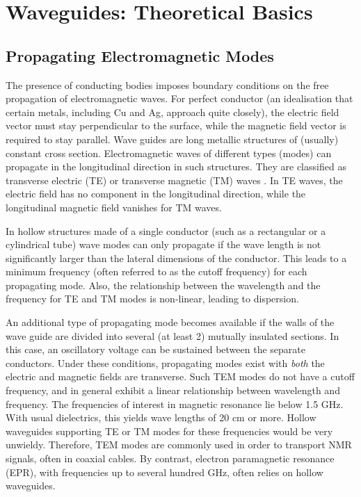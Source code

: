 \section{Waveguides: Theoretical Basics}\label{striplines-and-microslots-basics-and-theory}

\subsection{Propagating Electromagnetic Modes}\label{definition-of-a-stripline}

The presence of conducting bodies imposes boundary conditions on the
free propagation of electromagnetic waves. For perfect conductor (an
idealisation that certain metals, including Cu and Ag, approach quite
closely), the electric field vector must stay perpendicular to the
surface, while the magnetic field vector is required to stay parallel.
Wave guides are long metallic structures of (usually) constant cross
section. Electromagnetic waves of different types (modes) can propagate
in the longitudinal direction in such structures. They are classified as
transverse electric (TE) or transverse magnetic (TM) waves \cite{Pozar:2012to}. 
In TE waves, the electric field has no component in the longitudinal direction, while
the longitudinal magnetic field vanishes for TM waves. 

In hollow structures made of a single conductor (such as a rectangular or a cylindrical
tube) wave modes can only propagate if the wave length is not significantly larger
than the lateral dimensions of the conductor. This leads to a minimum frequency
(often referred to as the cutoff frequency) for each propagating mode. Also,
the relationship between the wavelength and the frequency for TE and TM
modes is non-linear, leading to dispersion. 

An additional type of
propagating mode becomes available if the walls of the wave guide are
divided into several (at least 2) mutually insulated sections. In this
case, an oscillatory voltage can be sustained between the separate
conductors. Under these conditions, propagating modes exist with
\textit{both} the electric and magnetic fields are transverse. Such TEM
modes do not have a cutoff frequency, and in general exhibit a linear
relationship between wavelength and frequency. The frequencies of interest
in magnetic resonance lie below 1.5 GHz. With usual dielectrics, this
yields wave lengths of 20 cm or more. Hollow waveguides supporting TE or TM
modes for these frequencies would be very unwieldy. Therefore, TEM modes are commonly
used in order to transport NMR signals, often in coaxial cables. 
By contrast, electron paramagnetic resonance (EPR), with frequencies up
to several hundred GHz, often relies on hollow waveguides.

